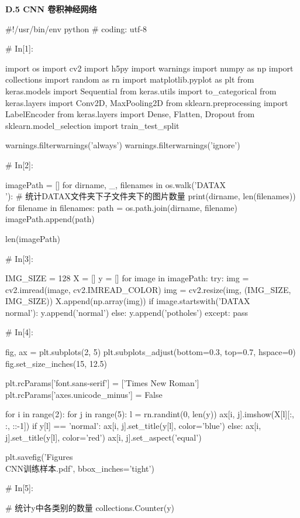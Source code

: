 \documentclass{MathorCupmodeling}
\begin{document}
\textbf{D.5 CNN 卷积神经网络}
\begin{python}
#!/usr/bin/env python
# coding: utf-8

# In[1]:


import os
import cv2
import h5py
import warnings
import numpy as np
import collections
import random as rn
import matplotlib.pyplot as plt
from keras.models import Sequential
from keras.utils import to_categorical
from keras.layers import Conv2D, MaxPooling2D
from sklearn.preprocessing import LabelEncoder
from keras.layers import Dense, Flatten, Dropout
from sklearn.model_selection import train_test_split

warnings.filterwarnings('always')
warnings.filterwarnings('ignore')

# In[2]:


imagePath = []
for dirname, _, filenames in os.walk('DATAX\\'):
    # 统计DATAX文件夹下子文件夹下的图片数量
    print(dirname, len(filenames))
    for filename in filenames:
        path = os.path.join(dirname, filename)
        imagePath.append(path)

len(imagePath)

# In[3]:


IMG_SIZE = 128
X = []
y = []
for image in imagePath:
    try:
        img = cv2.imread(image, cv2.IMREAD_COLOR)
        img = cv2.resize(img, (IMG_SIZE, IMG_SIZE))
        X.append(np.array(img))
        if image.startswith('DATAX\\normal'):
            y.append('normal')
        else:
            y.append('potholes')
    except:
        pass

# In[4]:


fig, ax = plt.subplots(2, 5)
plt.subplots_adjust(bottom=0.3, top=0.7, hspace=0)
fig.set_size_inches(15, 12.5)

plt.rcParams['font.sans-serif'] = ['Times New Roman']
plt.rcParams['axes.unicode_minus'] = False

for i in range(2):
    for j in range(5):
        l = rn.randint(0, len(y))
        ax[i, j].imshow(X[l][:, :, ::-1])
        if y[l] == 'normal':
            ax[i, j].set_title(y[l], color='blue')
        else:
            ax[i, j].set_title(y[l], color='red')
        ax[i, j].set_aspect('equal')

plt.savefig('Figures\\CNN训练样本.pdf', bbox_inches='tight')

# In[5]:


# 统计y中各类别的数量
collections.Counter(y)


\end{python}
\end{document}

